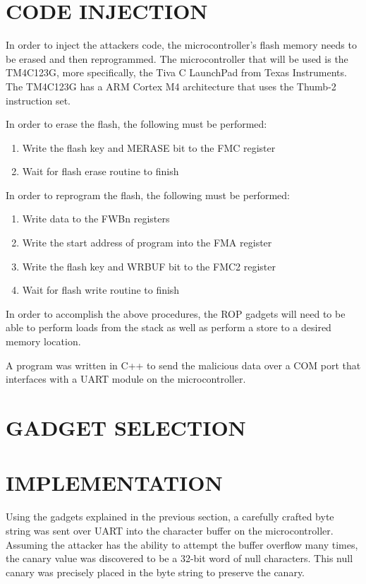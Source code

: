 \documentclass[letterpaper, 10 pt, conference]{ieeeconf}  %
\begin{document}
\section{CODE INJECTION}

In order to inject the attackers code, the microcontroller's flash memory needs to be erased and then reprogrammed.  The microcontroller that will be used is the TM4C123G, more specifically, the Tiva C LaunchPad from Texas Instruments.  The TM4C123G has a ARM Cortex M4 architecture that uses the Thumb-2 instruction set.

In order to erase the flash, the following must be performed:

\begin{enumerate}
\item Write the flash key and MERASE bit to the FMC register
\item Wait for flash erase routine to finish
\end{enumerate}

In order to reprogram the flash, the following must be performed:

\begin{enumerate}
\item Write data to the FWBn registers
\item Write the start address of program into the FMA register
\item Write the flash key and WRBUF bit to the FMC2 register
\item Wait for flash write routine to finish
\end{enumerate}

In order to accomplish the above procedures, the ROP gadgets will need to be able to perform loads from the stack as well as perform a store to a desired memory location.

A program was written in C++ to send the malicious data over a COM port that interfaces with a UART module on the microcontroller.

\section{GADGET SELECTION}

\section{IMPLEMENTATION}

Using the gadgets explained in the previous section, a carefully crafted byte string was sent over UART into the character buffer on the microcontroller.  Assuming the attacker has the ability to attempt the buffer overflow many times, the canary value was discovered to be a 32-bit word of null characters.  This null canary was precisely placed in the byte string to preserve the canary.
\end{document}

